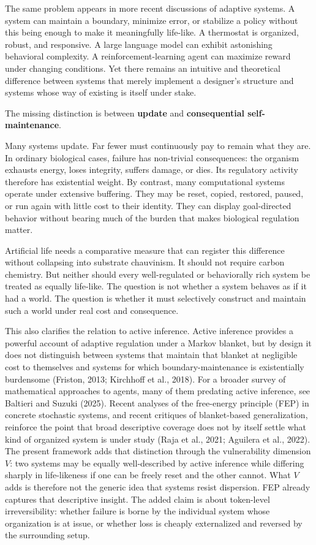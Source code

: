 \documentclass[Afour,sageh,times,doublespace]{sagej}
\begin{document}
The same problem appears in more recent discussions of adaptive systems. A system can maintain a boundary, minimize error, or stabilize a policy without this being enough to make it meaningfully life-like. A thermostat is organized, robust, and responsive. A large language model can exhibit astonishing behavioral complexity. A reinforcement-learning agent can maximize reward under changing conditions. Yet there remains an intuitive and theoretical difference between systems that merely implement a designer's structure and systems whose way of existing is itself under stake.

The missing distinction is between \textbf{update} and \textbf{consequential self-maintenance}.

Many systems update. Far fewer must continuously pay to remain what they are. In ordinary biological cases, failure has non-trivial consequences: the organism exhausts energy, loses integrity, suffers damage, or dies. Its regulatory activity therefore has existential weight. By contrast, many computational systems operate under extensive buffering. They may be reset, copied, restored, paused, or run again with little cost to their identity. They can display goal-directed behavior without bearing much of the burden that makes biological regulation matter.

Artificial life needs a comparative measure that can register this difference without collapsing into substrate chauvinism. It should not require carbon chemistry. But neither should every well-regulated or behaviorally rich system be treated as equally life-like. The question is not whether a system behaves as if it had a world. The question is whether it must selectively construct and maintain such a world under real cost and consequence.

This also clarifies the relation to active inference. Active inference provides a powerful account of adaptive regulation under a Markov blanket, but by design it does not distinguish between systems that maintain that blanket at negligible cost to themselves and systems for which boundary-maintenance is existentially burdensome (Friston, 2013; Kirchhoff et al., 2018). For a broader survey of mathematical approaches to agents, many of them predating active inference, see Baltieri and Suzuki (2025). Recent analyses of the free-energy principle (FEP) in concrete stochastic systems, and recent critiques of blanket-based generalization, reinforce the point that broad descriptive coverage does not by itself settle what kind of organized system is under study (Raja et al., 2021; Aguilera et al., 2022). The present framework adds that distinction through the vulnerability dimension \(V\): two systems may be equally well-described by active inference while differing sharply in life-likeness if one can be freely reset and the other cannot. What \(V\) adds is therefore not the generic idea that systems resist dispersion. FEP already captures that descriptive insight. The added claim is about token-level irreversibility: whether failure is borne by the individual system whose organization is at issue, or whether loss is cheaply externalized and reversed by the surrounding setup.
\end{document}
